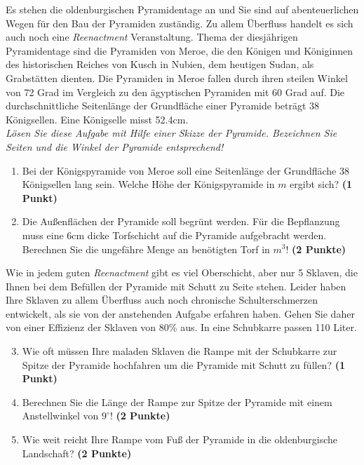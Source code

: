 \documentclass[a4paper, 9pt]{scrartcl}\usepackage[]{graphicx}\usepackage[]{xcolor}
\begin{document}
Es stehen die oldenburgischen Pyramidentage an und Sie sind auf
abenteuerlichen Wegen f{\"u}r den Bau der Pyramiden zust{\"a}ndig. Zu allem
{\"U}berfluss handelt es sich auch noch eine \textit{Reenactment}
Veranstaltung. Thema der diesj{\"a}hrigen Pyramidentage sind die Pyramiden von
Meroe, die den K{\"o}nigen und K{\"o}niginnen des historischen Reiches von Kusch in
Nubien, dem heutigen Sudan, als Grabst{\"a}tten dienten. Die Pyramiden in Meroe
fallen durch ihren steilen Winkel von 72 Grad im Vergleich zu
den {\"a}gyptischen Pyramiden mit 60 Grad auf. Die durchschnittliche
Seitenl{\"a}nge der Grundfl{\"a}che einer Pyramide betr{\"a}gt 38 K{\"o}nigsellen. Eine K{\"o}nigselle
misst 52.4cm.\\

\textit{L{\"o}sen Sie diese Aufgabe mit Hilfe einer Skizze der Pyramide. Bezeichnen
  Sie Seiten und die Winkel der Pyramide entsprechend!}

\begin{enumerate}
\item Bei der K{\"o}nigspyramide von Meroe soll eine Seitenl{\"a}nge der Grundfl{\"a}che
  38 K{\"o}nigsellen lang sein. Welche H{\"o}he der K{\"o}nigspyramide in $m$
  ergibt sich? \textbf{(1 Punkt)}
\item Die Au{\ss}enfl{\"a}chen der Pyramide soll begr{\"u}nt werden. F{\"u}r die
  Bepflanzung muss eine 6cm dicke Torfschicht auf die
  Pyramide aufgebracht werden. Berechnen Sie die ungef{\"a}hre Menge an
  ben{\"o}tigten Torf in $m^3$! \textbf{(2 Punkte)}
\end{enumerate}

Wie in jedem guten \textit{Reenactment} gibt es viel Oberschicht, aber nur
5 Sklaven, die Ihnen bei dem Bef{\"u}llen der Pyramide mit Schutt
zu Seite stehen. Leider haben Ihre Sklaven zu allem {\"U}berfluss auch noch
chronische Schulterschmerzen entwickelt, als sie von der
anstehenden Aufgabe erfahren haben. Gehen Sie daher von einer Effizienz der
Sklaven von 80\% aus. In eine Schubkarre passen
110 Liter.

\begin{enumerate}
  \setcounter{enumi}{2}
\item Wie oft m{\"u}ssen Ihre maladen Sklaven die Rampe mit der Schubkarre
  zur Spitze der Pyramide hochfahren um die Pyramide mit Schutt zu f{\"u}llen? \textbf{(1 Punkt)}
\item Berechnen Sie die L{\"a}nge der Rampe zur Spitze der Pyramide mit einem
  Anstellwinkel von $9^\circ$! \textbf{(2 Punkte)}
\item Wie weit reicht Ihre Rampe vom Fu{\ss} der Pyramide in die oldenburgische
  Landschaft?  \textbf{(2 Punkte)}
\end{enumerate}
\end{document}
